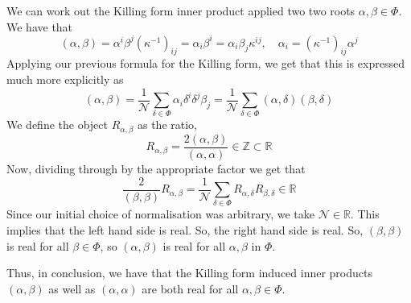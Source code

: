 We can work out the Killing form inner product applied two 
two roots $ \alpha , \beta \in \Phi$.  
We have that 
\[
\left(  \alpha, \beta  \right)   = \alpha ^ i \beta ^ j 
\left(  \kappa ^{ -1 }  \right)  _{ ij  } = \alpha _ i \beta ^ i  = \alpha _ i \beta _ j 
\kappa ^{ ij} , \quad \alpha _ i = \left(  \kappa ^{ - 1}  \right) _{ ij } \alpha ^ j 
\]  Applying our previous 
formula for the Killing form, 
we get that this is expressed much more 
explicitly as 
\[
\left( \alpha, \beta  \right) =\frac{1}{\mathcal{ N } } \sum_{ \delta \in \Phi }
\alpha _ i \delta ^ i \delta ^ j \beta _ j  = \frac{1}{\mathcal{ N } } 
\sum_{ \delta \in \Phi } \left(  \alpha, \delta  \right)  \left(  
\beta , \delta \right)  
\]  We define the object $R _{ \alpha, \beta } $ 
as the ratio, 
\[
R_{ \alpha, \beta } =  \frac{ 2 \left(  \alpha , \beta  \right)  }{ \left(  
\alpha, \alpha \right)  } \in \mathbb{ Z} \subset \mathbb{ R} 
\] Now, dividing through by the appropriate factor 
we get that 
\[
\frac{ 2 }{ \left(  \beta , \beta  \right)  } 
R _{ \alpha , \beta }   = \frac{1}{\mathcal{ N } } 
\sum_{ \delta \in \Phi  } R _{ \alpha, \delta } R _{ \beta , \delta } 
\in \mathbb{ R} 
\] Since our 
initial choice of normalisation 
was arbitrary, we take $ \mathcal{ N } \in \mathbb{ R} $. 
This implies that the left hand side is real. 
So, the right hand side is real. 
So, $ \left(  \beta , \beta  \right)  $ is real for all 
$ \beta \in \Phi  $,  so $ \left(  \alpha, \beta  \right)  $ 
is real for all $ \alpha , \beta $ in $ \Phi$. 

Thus, in conclusion, we have that 
the Killing form induced inner products 
$ \left( \alpha, \beta  \right)  $ as well as 
$ \left( \alpha, \alpha  \right)  $ are both real 
for all $ \alpha, \beta \in \Phi  $. 



